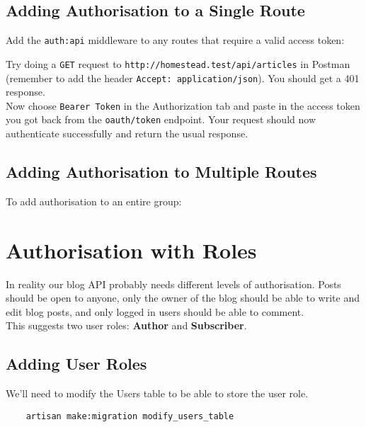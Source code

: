 \subsection{Adding Authorisation to a Single Route}

Add the \texttt{auth:api} middleware to any routes that require a valid access token:


Try doing a \texttt{GET} request to \texttt{http://homestead.test/api/articles} in Postman (remember to add the header \texttt{Accept: application/json}). You should get a 401 response.
\\

Now choose \texttt{Bearer Token} in the Authorization tab and paste in the access token you got back from the \texttt{oauth/token} endpoint. Your request should now authenticate successfully and return the usual response.

\subsection{Adding Authorisation to Multiple Routes}

To add authorisation to an entire group:




\section{Authorisation with Roles}

In reality our blog API probably needs different levels of authorisation. Posts should be open to anyone, only the owner of the blog should be able to write and edit blog posts, and only logged in users should be able to comment.
\\

This suggests two user roles: \textbf{Author} and \textbf{Subscriber}.


\subsection{Adding User Roles}

We'll need to modify the Users table to be able to store the user role.

\begin{verbatim}
    artisan make:migration modify_users_table
\end{verbatim}

